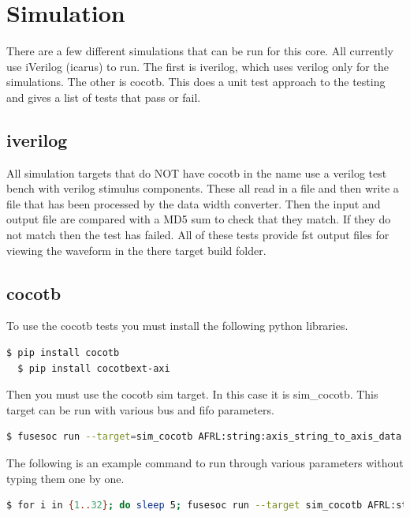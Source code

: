 \newpage

\section{Simulation}
\par
There are a few different simulations that can be run for this core. All currently use iVerilog (icarus) to run. The first is iverilog, which
uses verilog only for the simulations. The other is cocotb. This does a unit test approach to the testing and gives a list of tests that pass
or fail.

\subsection{iverilog}
\par
All simulation targets that do NOT have cocotb in the name use a verilog test bench with verilog stimulus components. These all read in a file
and then write a file that has been processed by the data width converter. Then the input and output file are compared with a MD5 sum to check that they
match. If they do not match then the test has failed. All of these tests provide fst output files for viewing the waveform in the there
target build folder.

\subsection{cocotb}
\par
To use the cocotb tests you must install the following python libraries.
\begin{lstlisting}[language=bash]
  $ pip install cocotb
  $ pip install cocotbext-axi
\end{lstlisting}

Then you must use the cocotb sim target. In this case it is sim\_cocotb. This target can be run with various bus and fifo parameters.
\begin{lstlisting}[language=bash]
  $ fusesoc run --target=sim_cocotb AFRL:string:axis_string_to_axis_data:1.0.0 --MBUS_WIDTH=1 --USER_WIDTH=8
\end{lstlisting}

The following is an example command to run through various parameters without typing them one by one.
\begin{lstlisting}[language=bash]
  $ for i in {1..32}; do sleep 5; fusesoc run --target sim_cocotb AFRL:string:axis_string_to_axis_data:1.0.0 --MBUS_WIDTH=$i ; echo "MASTER WIDTH:" $i; done
\end{lstlisting}
\newpage

